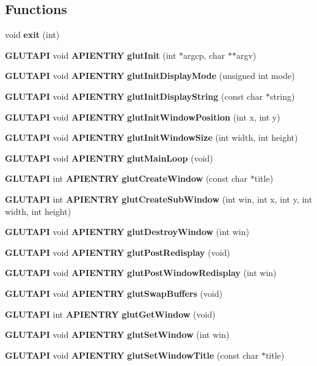 \subsection*{Functions}
\begin{DoxyCompactItemize}
\item 
void {\bf exit} (int)
\item 
{\bf G\+L\+U\+T\+A\+PI} void {\bf A\+P\+I\+E\+N\+T\+RY} {\bf glut\+Init} (int $\ast$argcp, char $\ast$$\ast$argv)
\item 
{\bf G\+L\+U\+T\+A\+PI} void {\bf A\+P\+I\+E\+N\+T\+RY} {\bf glut\+Init\+Display\+Mode} (unsigned int mode)
\item 
{\bf G\+L\+U\+T\+A\+PI} void {\bf A\+P\+I\+E\+N\+T\+RY} {\bf glut\+Init\+Display\+String} (const char $\ast$string)
\item 
{\bf G\+L\+U\+T\+A\+PI} void {\bf A\+P\+I\+E\+N\+T\+RY} {\bf glut\+Init\+Window\+Position} (int x, int y)
\item 
{\bf G\+L\+U\+T\+A\+PI} void {\bf A\+P\+I\+E\+N\+T\+RY} {\bf glut\+Init\+Window\+Size} (int width, int height)
\item 
{\bf G\+L\+U\+T\+A\+PI} void {\bf A\+P\+I\+E\+N\+T\+RY} {\bf glut\+Main\+Loop} (void)
\item 
{\bf G\+L\+U\+T\+A\+PI} int {\bf A\+P\+I\+E\+N\+T\+RY} {\bf glut\+Create\+Window} (const char $\ast$title)
\item 
{\bf G\+L\+U\+T\+A\+PI} int {\bf A\+P\+I\+E\+N\+T\+RY} {\bf glut\+Create\+Sub\+Window} (int win, int x, int y, int width, int height)
\item 
{\bf G\+L\+U\+T\+A\+PI} void {\bf A\+P\+I\+E\+N\+T\+RY} {\bf glut\+Destroy\+Window} (int win)
\item 
{\bf G\+L\+U\+T\+A\+PI} void {\bf A\+P\+I\+E\+N\+T\+RY} {\bf glut\+Post\+Redisplay} (void)
\item 
{\bf G\+L\+U\+T\+A\+PI} void {\bf A\+P\+I\+E\+N\+T\+RY} {\bf glut\+Post\+Window\+Redisplay} (int win)
\item 
{\bf G\+L\+U\+T\+A\+PI} void {\bf A\+P\+I\+E\+N\+T\+RY} {\bf glut\+Swap\+Buffers} (void)
\item 
{\bf G\+L\+U\+T\+A\+PI} int {\bf A\+P\+I\+E\+N\+T\+RY} {\bf glut\+Get\+Window} (void)
\item 
{\bf G\+L\+U\+T\+A\+PI} void {\bf A\+P\+I\+E\+N\+T\+RY} {\bf glut\+Set\+Window} (int win)
\item 
{\bf G\+L\+U\+T\+A\+PI} void {\bf A\+P\+I\+E\+N\+T\+RY} {\bf glut\+Set\+Window\+Title} (const char $\ast$title)
\item 
$$
\end{DoxyCompactItemize}
